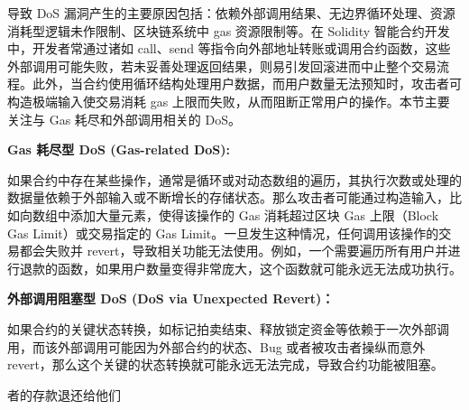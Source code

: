 \documentclass[print, master, vlined, timesmath]{DissertUESTC}
\begin{document}
导致 DoS 漏洞产生的主要原因包括：依赖外部调用结果、无边界循环处理、资源消耗型逻辑未作限制、区块链系统中 gas 资源限制等。在 Solidity 智能合约开发中，开发者常通过诸如 call、send 等指令向外部地址转账或调用合约函数，这些外部调用可能失败，若未妥善处理返回结果，则易引发回滚进而中止整个交易流程。此外，当合约使用循环结构处理用户数据，而用户数量无法预知时，攻击者可构造极端输入使交易消耗 gas 上限而失败，从而阻断正常用户的操作。本节主要关注与 Gas 耗尽和外部调用相关的 DoS。


\textbf{Gas 耗尽型 DoS (Gas-related DoS):}

如果合约中存在某些操作，通常是循环或对动态数组的遍历，其执行次数或处理的数据量依赖于外部输入或不断增长的存储状态。那么攻击者可能通过构造输入，比如向数组中添加大量元素，使得该操作的 Gas 消耗超过区块 Gas 上限（Block Gas Limit）或交易指定的 Gas Limit。一旦发生这种情况，任何调用该操作的交易都会失败并 revert，导致相关功能无法使用。例如，一个需要遍历所有用户并进行退款的函数，如果用户数量变得非常庞大，这个函数就可能永远无法成功执行。

\textbf{外部调用阻塞型 DoS (DoS via Unexpected Revert)：}

如果合约的关键状态转换，如标记拍卖结束、释放锁定资金等依赖于一次外部调用，而该外部调用可能因为外部合约的状态、Bug 或者被攻击者操纵而意外 revert，那么这个关键的状态转换就可能永远无法完成，导致合约功能被阻塞。

者的存款退还给他们
\end{document}
